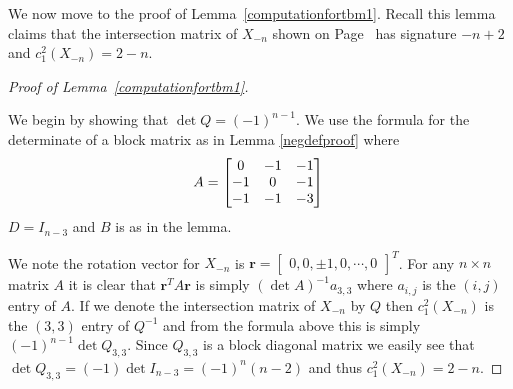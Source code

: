 \documentclass[12pt]{amsart}
\theoremstyle{definition}
\theoremstyle{definition}
\begin{document}
		
		We now move to the proof of Lemma~\ref{computationfortbm1}. Recall this lemma claims that the intersection matrix of $X_{-n}$ shown on Page~\pageref{computationfortbm1} has signature $-n+2$ and $c_1^2(X_{-n})=2-n$. 
		\begin{proof}[Proof of Lemma~\ref{computationfortbm1}]\label{opev}
		
			
			We begin by showing that $\det Q=(-1)^{n-1}$. We use the formula for the determinate of a block matrix as in Lemma \ref{negdefproof} where 
			\[ A=
			\begin{bmatrix}
				0 & -1 & -1 \\
				-1 & 0 & -1   \\
				-1 & -1 & -3   \\
			\end{bmatrix} \\
			\] 
			$D= I_{n-3}$ and $B$ is as in the lemma. 
			
			We note the rotation vector for $X_{-n}$ is $\mathbf{r}=\begin{bmatrix}0,0,\pm 1, 0, \cdots ,0\end{bmatrix}^T$. For any $n\times n$ matrix $A$ it is clear that $\mathbf{r}^TA\mathbf{r}$ is simply $(\det A)^{-1}a_{3,3}$ where $a_{i,j}$ is the $(i,j)$ entry of $A$. If we denote the intersection matrix of $X_{-n}$ by $Q$ then $c_1^2(X_{-n})$ is the $(3,3)$ entry of $Q^{-1}$ and from the formula above this is simply $(-1)^{n-1}\det Q_{3,3}$. Since $Q_{3,3}$ is a block diagonal matrix we easily see that $\det Q_{3,3}=(-1)\det I_{n-3}=(-1)^n(n-2)$ and thus $c_1^2(X_{-n})=2-n$. 
		\end{proof}
		
\end{document}
